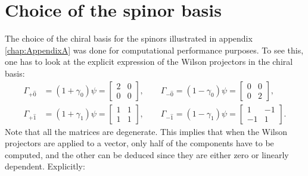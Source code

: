 \section*{Choice of the spinor basis}
The choice of the chiral basis for the spinors illustrated in appendix \ref{chap:AppendixA} was done for computational performance purposes. 
To see this, one has to look at the explicit expression of the Wilson projectors in the chiral basis:
\begin{equation*}
    \begin{aligned}
        \Gamma_{+ \hat 0} &= \left(1+\gamma_0\right) \psi=\left[\begin{array}{ll}
            2 & 0 \\
            0 & 0
            \end{array}\right],
        \qquad 
        \Gamma_{- \hat 0} = \left(1-\gamma_0\right) \psi=\left[\begin{array}{ll}
            0 & 0 \\
            0 & 2
            \end{array}\right],\\
        \Gamma_{+ \hat 1} &= \left(1+\gamma_1\right) \psi=\left[\begin{array}{ll}
            1 & 1 \\
            1 & 1
            \end{array}\right],
        \qquad 
        \Gamma_{- \hat 1} = \left(1-\gamma_1\right) \psi=\left[\begin{array}{cc}
            1 & -1 \\
            -1 & 1
            \end{array}\right].
    \end{aligned}
\end{equation*}
Note that all the matrices are degenerate. This implies that when the Wilson projectors are applied to a vector, only half of the components have to be computed, and the other can be deduced since they are either zero or linearly dependent. Explicitly:
